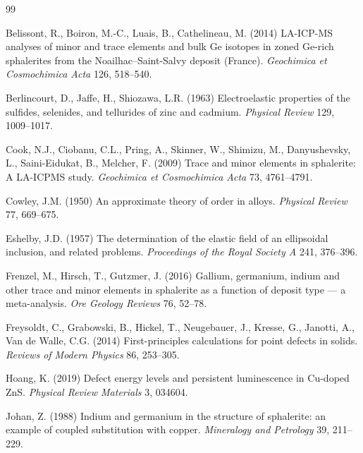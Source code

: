 \documentclass[11pt,a4paper]{article}
\begin{document}
\begin{thebibliography}{99}
\itemsep2pt

Belissont, R., Boiron, M.-C., Luais, B., Cathelineau, M. (2014) LA-ICP-MS
analyses of minor and trace elements and bulk Ge isotopes in zoned Ge-rich
sphalerites from the Noailhac--Saint-Salvy deposit (France). \textit{Geochimica
et Cosmochimica Acta} 126, 518--540.

Berlincourt, D., Jaffe, H., Shiozawa, L.R. (1963) Electroelastic properties of
the sulfides, selenides, and tellurides of zinc and cadmium. \textit{Physical
Review} 129, 1009--1017.

Cook, N.J., Ciobanu, C.L., Pring, A., Skinner, W., Shimizu, M., Danyushevsky,
L., Saini-Eidukat, B., Melcher, F. (2009) Trace and minor elements in
sphalerite: A LA-ICPMS study. \textit{Geochimica et Cosmochimica Acta} 73,
4761--4791.

Cowley, J.M. (1950) An approximate theory of order in alloys. \textit{Physical
Review} 77, 669--675.

Eshelby, J.D. (1957) The determination of the elastic field of an ellipsoidal
inclusion, and related problems. \textit{Proceedings of the Royal Society A}
241, 376--396.

Frenzel, M., Hirsch, T., Gutzmer, J. (2016) Gallium, germanium, indium and other
trace and minor elements in sphalerite as a function of deposit type --- a
meta-analysis. \textit{Ore Geology Reviews} 76, 52--78.

Freysoldt, C., Grabowski, B., Hickel, T., Neugebauer, J., Kresse, G., Janotti,
A., Van de Walle, C.G. (2014) First-principles calculations for point defects in
solids. \textit{Reviews of Modern Physics} 86, 253--305.

Hoang, K. (2019) Defect energy levels and persistent luminescence in Cu-doped
ZnS. \textit{Physical Review Materials} 3, 034604.

Johan, Z. (1988) Indium and germanium in the structure of sphalerite: an example
of coupled substitution with copper. \textit{Mineralogy and Petrology} 39,
211--229.


\end{thebibliography}
\end{document}
